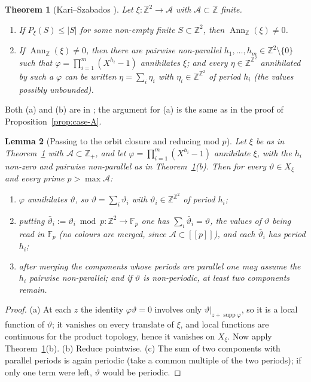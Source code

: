 \documentclass[11pt,reqno]{amsart}
\theoremstyle{plain}
\newtheorem{thm}{Theorem}[section]
\newtheorem{lem}[thm]{Lemma}
\theoremstyle{definition}
\theoremstyle{remark}
\theoremstyle{plain}
\theoremstyle{remark}
\theoremstyle{definition}
\numberwithin{equation}{section}
\DeclareMathOperator{\supp}{supp}
\newcommand{\Z}{\mathbb{Z}}
\newcommand{\Fp}{\mathbb{F}_p}
\newcommand{\cA}{\mathcal{A}}
\newcommand{\dbr}[1]{[\![#1]\!]}
\begin{document}
\begin{thm}[Kari--Szabados \cite{KS}]\label{thm:KS}
Let $\xi\colon\Z^2\to\cA$ with $\cA\subset\Z$ finite.
\begin{enumerate}
\item[\textup{(a)}] If $P_\xi(S)\le|S|$ for some non-empty finite
$S\subset\Z^2$, then $\operatorname{Ann}_\Z(\xi)\ne0$.
\item[\textup{(b)}] If $\operatorname{Ann}_\Z(\xi)\ne0$, then there are pairwise
non-parallel $h_1,\dots,h_m\in\Z^2\setminus\{0\}$ such that
$\varphi=\prod_{i=1}^m(X^{h_i}-1)$ annihilates $\xi$; and every
$\eta\in\Z^{\Z^2}$ annihilated by such a $\varphi$ can be written
$\eta=\sum_i\eta_i$ with $\eta_i\in\Z^{\Z^2}$ of period $h_i$ (the values
possibly unbounded).
\end{enumerate}
\end{thm}

Both (a) and (b) are in \cite{KS}; the argument for (a) is the same as in
the proof of Proposition~\ref{prop:case-A}.

\begin{lem}[Passing to the orbit closure and reducing mod
$p$]\label{lem:modp}
Let $\xi$ be as in Theorem~\ref{thm:KS} with $\cA\subset\Z_+$, and let
$\varphi=\prod_{i=1}^m(X^{h_i}-1)$ annihilate $\xi$, with the $h_i$ non-zero
and pairwise non-parallel as in Theorem~\ref{thm:KS}(b).  Then for every
$\vartheta\in X_\xi$ and every prime $p>\max\cA$:
\begin{enumerate}
\item[\textup{(a)}] $\varphi$ annihilates $\vartheta$, so
$\vartheta=\sum_i\vartheta_i$ with $\vartheta_i\in\Z^{\Z^2}$ of period $h_i$;
\item[\textup{(b)}] putting $\bar\vartheta_i:=\vartheta_i\bmod p\colon\Z^2\to
\Fp$ one has $\sum_i\bar\vartheta_i=\vartheta$, the values of $\vartheta$ being
read in $\Fp$ (no colours are merged, since $\cA\subset\dbr{p}$), and each
$\bar\vartheta_i$ has period $h_i$;
\item[\textup{(c)}] after merging the components whose periods are parallel one
may assume the $h_i$ pairwise non-parallel; and if $\vartheta$ is non-periodic,
at least two components remain.
\end{enumerate}
\end{lem}

\begin{proof}
(a) At each $z$ the identity $\varphi\vartheta=0$ involves only
$\vartheta|_{z+\supp\varphi}$, so it is a local function of $\vartheta$; it
vanishes on every translate of $\xi$, and local functions are continuous for the
product topology, hence it vanishes on $X_\xi$.  Now apply
Theorem~\ref{thm:KS}(b).  (b) Reduce pointwise.  (c) The sum of two components
with parallel periods is again periodic (take a common multiple of the two
periods); if only one term were left, $\vartheta$ would be periodic.
\end{proof}
\end{document}
